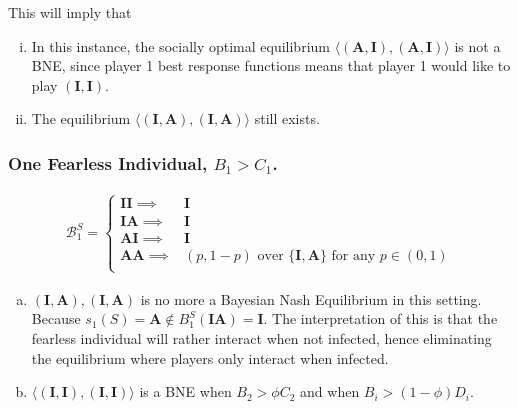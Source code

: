 \documentclass{article}
\theoremstyle{definition}
\theoremstyle{exercise}
\theoremstyle{remark}
\begin{document}
This will imply that 
\begin{enumerate}[i.]
    \item In this instance, the socially optimal equilibrium $\langle (\bm{A}, \bm{I}), (\bm{A}, \bm{I}) \rangle$ is not a BNE, since player 1 best response functions means that player 1 would like to play $(\bm{I}, \bm{I})$.
    \item  The equilibrium $\langle (\bm{I}, \bm{A}), (\bm{I}, \bm{A}) \rangle$ still exists.
\end{enumerate}
\subsubsection*{One Fearless Individual, $ B_1 > C_1$.}
\begin{align*}
    \mathcal{B}^{S}_1 = \begin{cases}
         \bm{II} \implies& \bm{I} \\
         \bm{IA}\implies& \bm{I}  \\
         \bm{AI}\implies& \bm{I}  \\
         \bm{AA}\implies& \text{$(p, 1 - p)$ over $\{ \bm{I}, \bm{A}\}$ for any $p \in (0,1)$} \\
    \end{cases}
\end{align*}
\begin{enumerate}[a.]
        \item $(\bm{I}, \bm{A}), (\bm{I}, \bm{A})$ is no more a Bayesian Nash Equilibrium in this setting. Because $s_1(S) = \bm{A} \notin B_1^{S}(\bm{IA}) = \bm{I}$. The interpretation of this is that the fearless individual will rather interact when not infected, hence eliminating the equilibrium where players only interact when infected.

        \item $ \langle (\bm{I}, \bm{I}), (\bm{I}, \bm{I}) \rangle$ is a BNE when $B_2 > \phi C_2$ and when $B_i > (1 - \phi)D_i$.
\end{enumerate}
\end{document}
